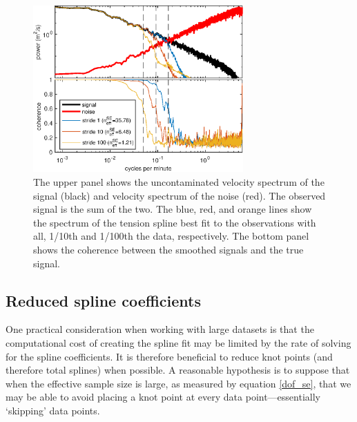 \documentclass[10pt,journal]{IEEEtran}
\begin{document}
\begin{figure}
  \centerline{\includegraphics[width=19pc,angle=0]{figures/synthetic_process_and_spectrum_slope2degree3}}
  
  \caption{The upper panel shows the uncontaminated velocity spectrum of the signal (black) and velocity spectrum of the noise (red). The observed signal is the sum of the two. The blue, red, and orange lines show the spectrum of the tension spline best fit to the observations with all, 1/10th and 1/100th the data, respectively. The bottom panel shows the coherence between the smoothed signals and the true signal.}
  \label{synthetic_process_and_spectrum}
\end{figure}


\subsection{Reduced spline coefficients} \label{reduced_coefficients}

One practical consideration when working with large datasets is that the computational cost of creating the spline fit may be limited by the rate of solving for the spline coefficients. It is therefore beneficial to reduce knot points (and therefore total splines) when possible. A reasonable hypothesis is to suppose that when the effective sample size is large, as measured by equation \ref{dof_se}, that we may be able to avoid placing a knot point at every data point---essentially `skipping' data points.
\end{document}
